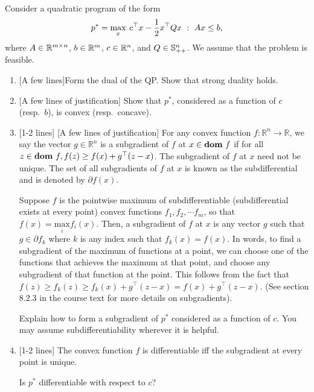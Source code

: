 \rm

Consider a quadratic program of the form
\[
p^* = \max_x \: c{^{\top}} x - \frac{1}{2}x{^{\top}} Qx ~:~ Ax \le b,
\]
where $A \in \mathbb{R}^{m\times n}$, $b \in \mathbb{R}^{m}$, $c \in \mathbb{R}^{n}$, and $Q \in { {\mathbb S}_{++}^{n} }$. We assume that the problem is feasible.
\begin{enumerate}
	\item {[A few lines]}Form the dual of the QP. Show that strong duality holds.
	
	\sol{}
	\item 
	{[A few lines of justification]}
	Show that $p^*$, considered as a function of $c$ (resp.\ $b$), is convex (resp.\ concave).
	
	\sol{}
	\item 
	{[1-2 lines]}
	{[A few lines of justification]}
	For any convex function $f: \mathbb{R}^n \rightarrow \mathbb{R}$, we say the vector $g \in \mathbb{R}^n$ is a subgradient of $f$ at $x \in \text{\textbf{dom} } f$ if for all $z \in \text{\textbf{dom} } f, f(z) \geq f(x) + g^{\top}(z-x)$.  The subgradient of $f$ at $x$ need not  be unique. The set of all subgradients of $f$ at $x$ is known as the subdifferential and is denoted by $\partial f(x)$. 
	
	Suppose $f$ is the pointwise maximum of subdifferentiable (subdifferential exists at every point) convex functions $f_1, f_2, \cdots f_m$, so that $f(x) = \underset{i}{\text{max}} f_i(x)$. Then, a subgradient of $f$ at $x$ is any vector $g$ such that $g \in \partial f_{k}$ where $k$ is any index such that $f_{k}(x) = f(x)$. In words, to find a subgradient of the maximum of functions at a point, we can choose one of the functions that achieves the maximum at that point, and choose any subgradient of that function at the point. This follows from the fact that $f(z) \geq f_{k}(z) \geq f_{k}(x) + g^{\top}(z-x) = f(x) + g^{\top}(z-x)$. (See section $8.2.3$ in the course text for more details on subgradients).
	
	
	
	Explain how to form a subgradient of $p^*$ considered as a function of $c$. You may assume subdifferentiability wherever it is helpful.
	
	\sol{}
	
	\item {[1-2 lines]}
	The convex function $f$ is differentiable iff the subgradient at every point is unique. 
	
	
	Is $p^*$ differentiable with respect to $c$?
	
	\sol{}
\end{enumerate}
